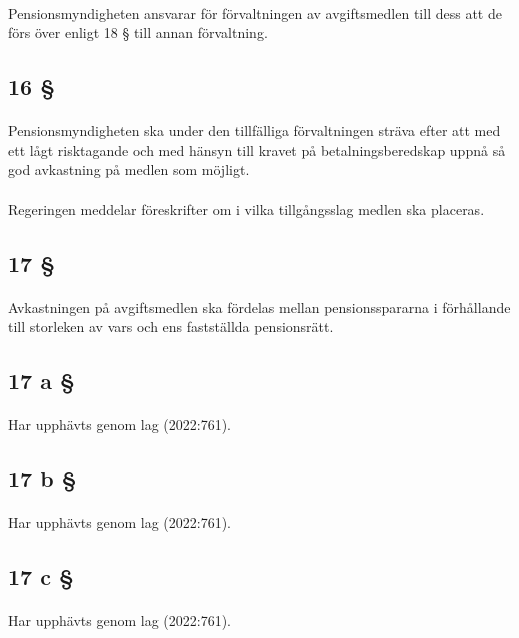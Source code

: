 \documentclass[a4paper,notitlepage,openany,10pt]{book}
\begin{document}
\paragraph*{}
Pensionsmyndigheten ansvarar för förvaltningen av avgiftsmedlen till dess att de förs över enligt 18 § till annan förvaltning.
\subsection*{16 §}
\paragraph*{}
Pensionsmyndigheten ska under den tillfälliga förvaltningen sträva efter att med ett lågt risktagande och med hänsyn till kravet på betalningsberedskap uppnå så god avkastning på medlen som möjligt.
\paragraph*{}
Regeringen meddelar föreskrifter om i vilka tillgångsslag medlen ska placeras.
\subsection*{17 §}
\paragraph*{}
Avkastningen på avgiftsmedlen ska fördelas mellan pensionsspararna i förhållande till storleken av vars och ens fastställda pensionsrätt.
\subsection*{17 a §}
\paragraph*{}
Har upphävts genom
lag (2022:761).
\subsection*{17 b §}
\paragraph*{}
Har upphävts genom
lag (2022:761).
\subsection*{17 c §}
\paragraph*{}
Har upphävts genom
lag (2022:761).
\end{document}
